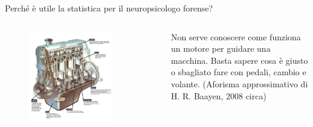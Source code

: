 \documentclass[
  ignorenonframetext,
]{beamer}
\begin{document}
\begin{frame}{Perché è utile la statistica per il neuropsicologo
forense?}
\label{perchuxe9-uxe8-utile-la-statistica-per-il-neuropsicologo-forense}
\begin{columns}

\begin{figure}
\includegraphics[width=0.8\textwidth]{Figures/Motore.png}
\end{figure}
\tiny{Non serve conoscere come funziona un motore per guidare una macchina. Basta sapere cosa è giusto o sbagliato fare con pedali, cambio e volante. (Aforisma approssimativo di H. R. Baayen, 2008 circa)}




\end{columns}
\end{frame}
\end{document}
